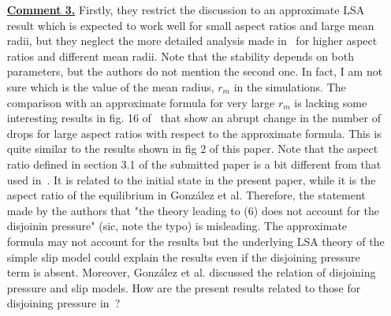 \documentclass[12pt,english]{article}
\begin{document}
\begin{itemize}
\item[ \textbf{\underline{Comment 3.}}]
{
Firstly, they restrict the discussion to an approximate LSA result which is expected to work well for small aspect ratios and large mean radii, but they neglect the more detailed analysis made in~\cite{gonzalezStabilityLiquidRing2013} for higher aspect ratios and different mean radii. 
Note that the stability depends on both parameters, but the authors do not mention the second one. 
In fact, I am not sure which is the value of the mean radius, $r_m$ in the simulations. 
The comparison with an approximate formula for very large $r_m$ is lacking some interesting results in fig. 16 of~\cite{gonzalezStabilityLiquidRing2013} that show an abrupt change in the number of drops for large aspect ratios with respect to the approximate formula. 
This is quite similar to the results shown in fig 2 of this paper. 
Note that the aspect ratio defined in section 3.1 of the submitted paper is a bit different from that used in~\cite{gonzalezStabilityLiquidRing2013}. 
It is related to the initial state in the present paper, while it is the aspect ratio of the equilibrium in Gonz\'alez et al. 
Therefore, the statement made by the authors that "the theory leading to (6) does not account for the disjoinin pressure" (sic, note the typo) is misleading. 
The approximate formula may not account for the results but the underlying LSA theory of the simple slip model could explain the results even if the disjoining pressure term is absent.
Moreover, Gonz\'alez et al. discussed the relation of disjoining pressure and slip models. 
How are the present results related to those for disjoining pressure in~\cite{gonzalezStabilityLiquidRing2013}?
}


\end{itemize}
\end{document}

